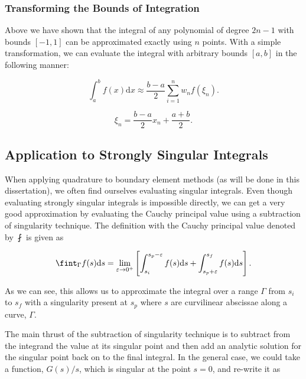 \subsubsection{Transforming the Bounds of Integration}

Above we have shown that the integral of any polynomial of degree \(2n-1\) with bounds \([-1,1]\) can be approximated exactly using \(n\) points.
%
With a simple transformation, we can evaluate the integral with arbitrary bounds \([a,b]\) in the following manner:

\begin{equation}
    \int_{a}^{b} f(x) \mathrm{d}x \approx \frac{b-a}{2} \sum_{i=1}^n w_n f(\xi_n).
\end{equation}

\where

\begin{equation}
    \xi_n = \frac{b-a}{2}x_n + \frac{a+b}{2}.
\end{equation}




\subsection{Application to Strongly Singular Integrals}

When applying quadrature to boundary element methods (as will be done in this dissertation), we often find ourselves evaluating singular integrals.
%
Even though evaluating strongly singular integrals is impossible directly, we can get a very good approximation by evaluating the Cauchy principal value using a subtraction of singularity technique.
%
The definition with the Cauchy principal value denoted by \(\fint\) is given as

\begin{equation}
    \fint_{\Gamma} f(s) \d s = \lim_{ \varepsilon \rightarrow 0^+} \left[ \int_{s_i}^{s_p -\varepsilon} f(s) \d s + \int_{s_p + \varepsilon}^{s_f}  f(s) \d s \right].
\end{equation}

\noindent As we can see, this allows us to approximate the integral over a range \(\Gamma\) from \(s_i\) to \(s_f\) with a singularity present at \(s_p\) where \(s\) are curvilinear abscissae along a curve, \(\Gamma\).

The main thrust of the subtraction of singularity technique is to subtract from the integrand the value at its singular point and then add an analytic solution for the singular point back on to the final integral.
%
In the general case, we could take a function, \(G(s)/s\), which is singular at the point \(s=0\), and re-write it as


